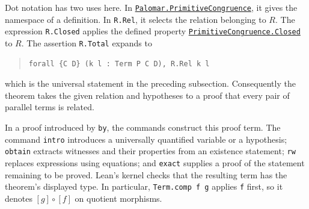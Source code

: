\documentclass[11pt]{article}
\begin{document}
Dot notation has two uses here. In
\href{https://github.com/flengyel/Dosen-Petric-Maximality/blob/dosen-petric-v25-palomar-v3/DosenPetric/PalomarDefinitions.lean\#L14}{\texttt{Palomar.PrimitiveCongruence}}, it gives the namespace of a
definition. In \texttt{R.Rel}, it selects the relation belonging
to $R$. The expression \texttt{R.Closed} applies the defined
property \href{https://github.com/flengyel/Dosen-Petric-Maximality/blob/dosen-petric-v25-palomar-v3/DosenPetric/PalomarDefinitions.lean\#L31}{\texttt{PrimitiveCongruence.Closed}} to $R$.
The assertion \texttt{R.Total} expands to
\begin{quote}
\begin{verbatim}
forall {C D} (k l : Term P C D), R.Rel k l
\end{verbatim}
\end{quote}
which is the universal statement in the preceding subsection.
Consequently the theorem takes the given relation and hypotheses
to a proof that every pair of parallel terms is related.

In a proof introduced by \texttt{by}, the commands construct this
proof term. The command \texttt{intro} introduces a universally
quantified variable or a hypothesis; \texttt{obtain} extracts
witnesses and their properties from an existence statement;
\texttt{rw} replaces expressions using equations; and
\texttt{exact} supplies a proof of the statement remaining to
be proved. Lean's kernel checks that the resulting term has the theorem's displayed type.
In particular, \texttt{Term.comp f g} applies \texttt{f} first,
so it denotes $[g]\circ[f]$ on quotient morphisms.
\end{document}
